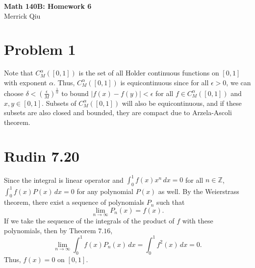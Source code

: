 \documentclass{article}
\begin{document}
\begin{center}
	\huge{\bf Math 140B: Homework 6} \\
	Merrick Qiu
\end{center}

\section*{Problem 1}
Note that $C_M^\alpha([0,1])$ is the set of all Holder continuous
functions on $[0,1]$ with exponent $\alpha$.
Thus, $C_M^\alpha([0,1])$ is equicontinuous since 
for all $\epsilon > 0$, we can choose $\delta < \left(\frac{\epsilon}{M}\right)^\frac{1}{\alpha}$
to bound $|f(x) - f(y)| < \epsilon$ for all $f \in C_M^\alpha([0,1])$ and $x, y \in [0,1]$.
Subsets of $C_M^\alpha([0,1])$ will also be equicontinuous, and if these
subsets are also closed and bounded, they are compact due to Arzela-Ascoli theorem.
\newpage 

\section*{Rudin 7.20}
Since the integral is linear operator and $\int_0^1 f(x)x^n\, dx = 0$ for all $n \in \mathbb{Z}$,
$\int_0^1 f(x)P(x)\, dx = 0$ for any polynomial $P(x)$ as well.
By the Weierstrass theorem, there exist a sequence of polynomials $P_n$ such that 
\[
  \lim_{n\to \infty} P_n(x) = f(x).
\]
If we take the sequence of the integrals of the product of $f$ with these polynomials,
then by Theorem $7.16$,
\[
  \lim_{n\to \infty} \int_0^1 f(x)P_n(x)\, dx = \int_0^1 f^2(x)\, dx = 0.
\]
Thus, $f(x) = 0$ on $[0,1]$.
\newpage 
\end{document}
